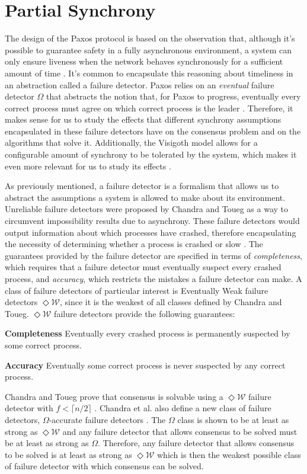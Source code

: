 \section{Partial Synchrony} \label{Partial Synchrony}
The design of the Paxos protocol is based on the observation that, although it's possible to guarantee safety in a fully asynchronous environment, a system can only ensure liveness when the network behaves synchronously for a sufficient amount of time \cite{Lamport2001}. It's common to encapsulate this reasoning about timeliness in an abstraction called a failure detector. Paxos relies on an \textit{eventual} failure detector $\Omega$ that abstracts the notion that, for Paxos to progress, eventually every correct process must agree on which correct process is the leader \cite{vukolic2012quorum}. Therefore, it makes sense for us to study the effects that different synchrony assumptions encapsulated in these failure detectors have on the consensus problem and on the algorithms that solve it. Additionally, the Visigoth model allows for a configurable amount of synchrony to be tolerated by the system, which makes it even more relevant for us to study its effects \cite{Porto2015}. \par
As previously mentioned, a failure detector is a formalism that allows us to abstract the assumptions a system is allowed to make about its environment. Unreliable failure detectors were proposed by Chandra and Toueg as a way to circumvent impossibility results due to asynchrony. These failure detectors would output information about which processes have crashed, therefore encapsulating the necessity of determining whether a process is crashed or slow \cite{DeepakChandra1996}. The guarantees provided by the failure detector are specified in terms of \textit{completeness}, which requires that a failure detector must eventually suspect every crashed process, and \textit{accuracy}, which restricts the mistakes a failure detector can make. A class of failure detectors of particular interest is Eventually Weak failure detectors $\Diamond\mathcal{W}$, since it is the weakest of all classes defined by Chandra and Toueg. $\Diamond\mathcal{W}$ failure detectors provide the following guarantees:\par
\textbf{Completeness} Eventually every crashed process is permanently suspected by some correct process.\par
\textbf{Accuracy} Eventually some correct process is never suspected by any correct process.\par
Chandra and Toueg prove that consensus is solvable using a $\Diamond\mathcal{W}$ failure detector with $f < \lceil n/2 \rceil$ \cite{DeepakChandra1996}. Chandra et al. also define a new class of failure detectors, $\Omega$-accurate failure detectors \cite{Chandra1996}. The $\Omega$ class is shown to be at least as strong as $\Diamond\mathcal{W}$ and any failure detector that allows consensus to be solved must be at least as strong as $\Omega$. Therefore, any failure detector that allows consensus to be solved is at least as strong as $\Diamond\mathcal{W}$ which is then the weakest possible class of failure detector with which consensus can be solved. \par

